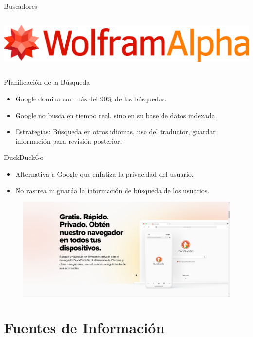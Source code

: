 \documentclass[
11pt, %
]{beamer}
\begin{document}
\begin{frame}{Buscadores}
\begin{columns}[T]
		\centering
		\includegraphics[width=0.8\linewidth]{images/wolaframalpha_icon}
	\end{columns}
\end{frame}

\begin{frame}{Planificación de la Búsqueda}
	\begin{itemize}
		\item Google domina con más del 90\% de las búsquedas.
		\item Google no busca en tiempo real, sino en su base de datos indexada.
		\item Estrategias: Búsqueda en otros idiomas, uso del traductor, guardar información para revisión posterior.
	\end{itemize}
\end{frame}

\begin{frame}{DuckDuckGo}
	\begin{itemize}
		\item Alternativa a Google que enfatiza la privacidad del usuario.
		\item No rastrea ni guarda la información de búsqueda de los usuarios.
	\end{itemize}

	\begin{figure}[H]
		\centering
		\includegraphics[width=1\linewidth]{images/image05}
	\end{figure}
\end{frame}

\section{Fuentes de Información}
\end{document}
